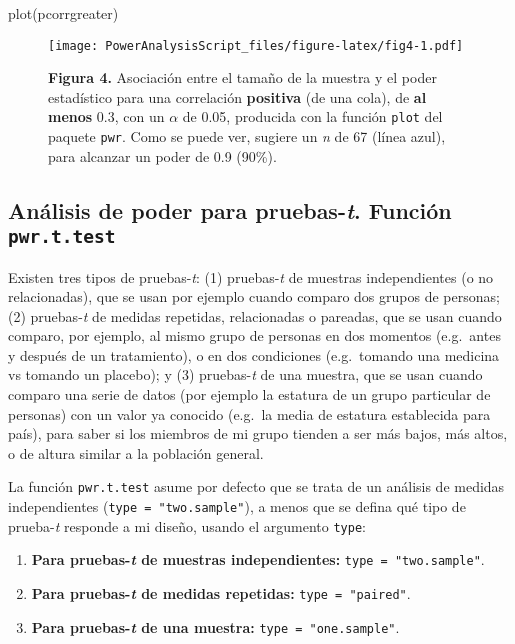 \documentclass[
]{article}
\newenvironment{Shaded}{\begin{snugshade}}{\end{snugshade}}
\newcommand{\FunctionTok}[1]{\textcolor[rgb]{0.56,0.27,0.68}{#1}}
\newcommand{\NormalTok}[1]{\textcolor[rgb]{0.81,0.81,0.76}{#1}}
\providecommand{\tightlist}{%
  \setlength{\itemsep}{0pt}\setlength{\parskip}{0pt}}
\begin{document}
\begin{Shaded}
\begin{Highlighting}[]
\FunctionTok{plot}\NormalTok{(pcorrgreater)}
\end{Highlighting}
\end{Shaded}

\begin{figure}
\centering
\texttt{[image: PowerAnalysisScript\_files/figure-latex/fig4-1.pdf]}
\caption{\textbf{Figura 4.} Asociación entre el tamaño de la muestra y
el poder estadístico para una correlación \textbf{positiva} (de una
cola), de \textbf{al menos} 0.3, con un \(\alpha\) de 0.05, producida
con la función \texttt{plot} del paquete \texttt{pwr}. Como se puede
ver, sugiere un \emph{n} de 67 (línea azul), para alcanzar un poder de
0.9 (90\%).}
\end{figure}

\hypertarget{anuxe1lisis-de-poder-para-pruebas-t.-funciuxf3n-pwr.t.test}{%
\subsection{\texorpdfstring{Análisis de poder para pruebas-\emph{t}.
Función
\texttt{pwr.t.test}}{Análisis de poder para pruebas-t. Función pwr.t.test}}\label{anuxe1lisis-de-poder-para-pruebas-t.-funciuxf3n-pwr.t.test}}

Existen tres tipos de pruebas-\emph{t}: (1) pruebas-\emph{t} de muestras
independientes (o no relacionadas), que se usan por ejemplo cuando
comparo dos grupos de personas; (2) pruebas-\emph{t} de medidas
repetidas, relacionadas o pareadas, que se usan cuando comparo, por
ejemplo, al mismo grupo de personas en dos momentos (e.g.~antes y
después de un tratamiento), o en dos condiciones (e.g.~tomando una
medicina vs tomando un placebo); y (3) pruebas-\emph{t} de una muestra,
que se usan cuando comparo una serie de datos (por ejemplo la estatura
de un grupo particular de personas) con un valor ya conocido (e.g.~la
media de estatura establecida para país), para saber si los miembros de
mi grupo tienden a ser más bajos, más altos, o de altura similar a la
población general.

La función \texttt{pwr.t.test} asume por defecto que se trata de un
análisis de medidas independientes (\texttt{type\ =\ "two.sample"}), a
menos que se defina qué tipo de prueba-\emph{t} responde a mi diseño,
usando el argumento \texttt{type}:

\begin{enumerate}
\def\labelenumi{\arabic{enumi}.}
\tightlist
\item
  \textbf{Para pruebas-\emph{t} de muestras independientes:}
  \texttt{type\ =\ "two.sample"}.
\item
  \textbf{Para pruebas-\emph{t} de medidas repetidas:}
  \texttt{type\ =\ "paired"}.
\item
  \textbf{Para pruebas-\emph{t} de una muestra:}
  \texttt{type\ =\ "one.sample"}.
\end{enumerate}
\end{document}
